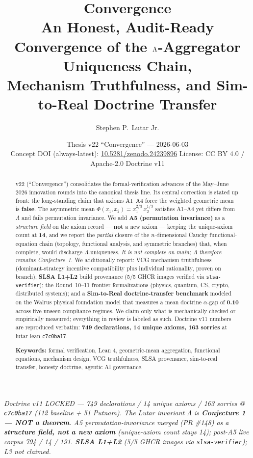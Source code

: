 \documentclass[11pt]{article}
\title{\textbf{Convergence}\\[2pt]
\large An Honest, Audit-Ready Convergence of the $\La$-Aggregator Uniqueness Chain,\\
Mechanism Truthfulness, and Sim-to-Real Doctrine Transfer}
\author[1]{Stephen P.\ Lutar Jr.}
\affil[1]{SZL Holdings, Inc. \quad ORCID: \href{https://orcid.org/0009-0001-0110-4173}{0009-0001-0110-4173}}
\date{Thesis v22 ``Convergence'' --- 2026-06-03\\[4pt]
\small Concept DOI (always-latest): \href{https://doi.org/10.5281/zenodo.24239896}{10.5281/zenodo.24239896}
\quad License: CC BY 4.0 / Apache-2.0 \quad Doctrine v11}
\theoremstyle{plain}
\theoremstyle{definition}
\theoremstyle{remark}
\newcommand{\La}{\Lambda}
\begin{document}
\maketitle
\thispagestyle{fancy}

\begin{center}\small\itshape
Doctrine v11 LOCKED --- 749 declarations / 14 unique axioms / 163 sorries @
\texttt{c7c0ba17} (112 baseline + 51 Putnam). The Lutar invariant $\La$ is
\textbf{Conjecture 1 --- NOT a theorem}. A5 permutation-invariance merged (PR \#148)
as a \textbf{structure field, not a new axiom} (unique-axiom count stays 14);
post-A5 live corpus 794 / 14 / 191. \textbf{SLSA L1+L2} (5/5 GHCR images via
\texttt{slsa-verifier}); L3 not claimed.
\end{center}

\begin{abstract}
\noindent
v22 (``Convergence'') consolidates the formal-verification advances of the
May--June 2026 innovation rounds into the canonical thesis line. Its central
correction is stated up front: the long-standing claim that axioms A1--A4 force
the weighted geometric mean is \textbf{false}. The asymmetric mean
$\Phi(x_1,x_2)=x_1^{2/3}\,x_2^{1/3}$ satisfies A1--A4 yet differs from $\La$ and
fails permutation invariance. We add \textbf{A5 (permutation invariance)} as a
\emph{structure field} on the axiom record --- \textbf{not} a new axiom --- keeping
the unique-axiom count at \textbf{14}, and we report the \emph{partial} closure of
the $n$-dimensional Cauchy functional-equation chain (topology, functional
analysis, and symmetric branches) that, when complete, would discharge
$\La$-uniqueness. \emph{It is not complete on main; $\La$ therefore remains
Conjecture~1.} We additionally report: VCG mechanism truthfulness (dominant-strategy
incentive compatibility plus individual rationality, proven on branch); \textbf{SLSA
L1+L2} build provenance (5/5 GHCR images verified via \texttt{slsa-verifier}); the
Round~10--11 frontier formalizations (physics, quantum, CS, crypto, distributed
systems); and a \textbf{Sim-to-Real doctrine-transfer benchmark} modeled on the
Walrus physical foundation model that measures a mean doctrine $\alpha$-gap of
\textbf{0.10} across five unseen compliance regimes. We claim only what is
mechanically checked or empirically measured; everything in review is labeled as
such. Doctrine v11 numbers are reproduced verbatim: \textbf{749 declarations, 14
unique axioms, 163 sorries} at lutar-lean \texttt{c7c0ba17}.

\medskip
\noindent\textbf{Keywords:} formal verification, Lean 4, geometric-mean aggregation,
functional equations, mechanism design, VCG truthfulness, SLSA provenance,
sim-to-real transfer, honesty doctrine, agentic AI governance.
\end{abstract}
\end{document}
